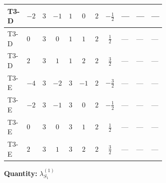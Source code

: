 \documentclass[8pt]{article}
\begin{document}
\begin{landscape}
\begin{longtable}{@{}llcccccc >{\raggedright\arraybackslash}p{0.21\linewidth} >{\raggedright\arraybackslash}p{0.21\linewidth} >{\raggedright\arraybackslash}p{0.21\linewidth}@{}}
\midrule
T3-D & $-2$ & $3$ & $-1$ & $1$ & $0$ & $2$ & $-\frac{1}{2}$ & --- & --- & --- \\
\midrule
T3-D & $0$ & $3$ & $0$ & $1$ & $1$ & $2$ & $\frac{1}{2}$ & --- & --- & --- \\
\midrule
T3-D & $2$ & $3$ & $1$ & $1$ & $2$ & $2$ & $\frac{3}{2}$ & --- & --- & --- \\
\midrule
T3-E & $-4$ & $3$ & $-2$ & $3$ & $-1$ & $2$ & $-\frac{3}{2}$ & --- & --- & --- \\
\midrule
T3-E & $-2$ & $3$ & $-1$ & $3$ & $0$ & $2$ & $-\frac{1}{2}$ & --- & --- & --- \\
\midrule
T3-E & $0$ & $3$ & $0$ & $3$ & $1$ & $2$ & $\frac{1}{2}$ & --- & --- & --- \\
\midrule
T3-E & $2$ & $3$ & $1$ & $3$ & $2$ & $2$ & $\frac{3}{2}$ & --- & --- & --- \\
\midrule
\bottomrule
\end{longtable}
\clearpage
\noindent\textbf{Quantity: }$\lambda_{S_1}^{(1)}$\par\smallskip

\end{landscape}
\end{document}
